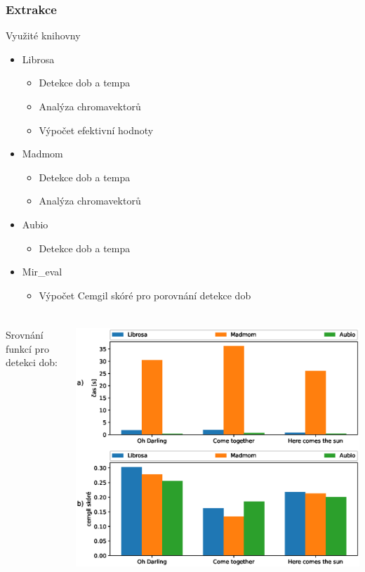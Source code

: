 \documentclass[%
  12pt,       				%
	t,                  %
	aspectratio=1610,   %
	unicode,						%
]{beamer}				    	%
\begin{document}
\begin{frame}
	\frametitle{Extrakce}
	\begin{block}{Využité knihovny}
		\begin{itemize}
			\item Librosa
				\begin{itemize}
					\item Detekce dob a tempa
					\item Analýza chromavektorů
					\item Výpočet efektivní hodnoty
				\end{itemize}
			\item Madmom
				\begin{itemize}
					\item Detekce dob a tempa
					\item Analýza chromavektorů
				\end{itemize}
			\item Aubio
				\begin{itemize}
					\item Detekce dob a tempa
				\end{itemize}
			\item Mir\_eval
				\begin{itemize}
					\item Výpočet Cemgil skóré pro porovnání detekce dob
				\end{itemize}
		\end{itemize}
	\end{block}
\end{frame}

\begin{frame}
	\frametitle{}

	\begin{columns}[T]
		\begin{column}{0.2\textwidth}
			Srovnání funkcí pro detekci dob:
		\end{column}
		\begin{column}{0.8\textwidth}
			\includegraphics[width = 0.9\columnwidth]{obrazky/Beat_tracking_time_and_cemgil_graphs.eps}
		\end{column}
	\end{columns}
\end{frame}
\end{document}
